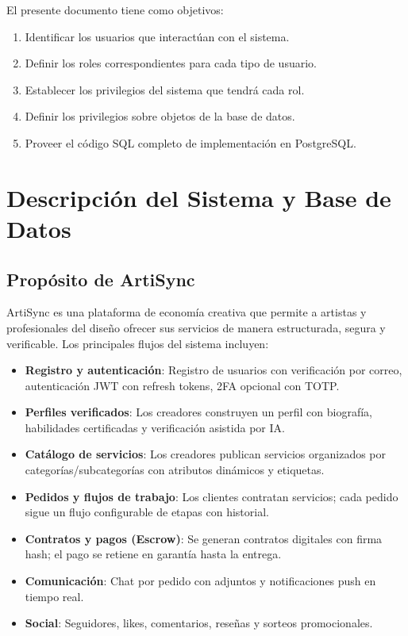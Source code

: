 \documentclass[conference, onecolumn]{IEEEtran}
\begin{document}
El presente documento tiene como objetivos:
\begin{enumerate}[label=\arabic*)]
    \item Identificar los usuarios que interactúan con el sistema.
    \item Definir los roles correspondientes para cada tipo de usuario.
    \item Establecer los privilegios del sistema que tendrá cada rol.
    \item Definir los privilegios sobre objetos de la base de datos.
    \item Proveer el código SQL completo de implementación en PostgreSQL.
\end{enumerate}

\section{Descripción del Sistema y Base de Datos}

\subsection{Propósito de ArtiSync}

ArtiSync es una plataforma de economía creativa que permite a artistas y profesionales del diseño ofrecer sus servicios de manera estructurada, segura y verificable. Los principales flujos del sistema incluyen:

\begin{itemize}
    \item \textbf{Registro y autenticación}: Registro de usuarios con verificación por correo, autenticación JWT con refresh tokens, 2FA opcional con TOTP.
    \item \textbf{Perfiles verificados}: Los creadores construyen un perfil con biografía, habilidades certificadas y verificación asistida por IA.
    \item \textbf{Catálogo de servicios}: Los creadores publican servicios organizados por categorías/subcategorías con atributos dinámicos y etiquetas.
    \item \textbf{Pedidos y flujos de trabajo}: Los clientes contratan servicios; cada pedido sigue un flujo configurable de etapas con historial.
    \item \textbf{Contratos y pagos (Escrow)}: Se generan contratos digitales con firma hash; el pago se retiene en garantía hasta la entrega.
    \item \textbf{Comunicación}: Chat por pedido con adjuntos y notificaciones push en tiempo real.
    \item \textbf{Social}: Seguidores, likes, comentarios, reseñas y sorteos promocionales.
\end{itemize}
\end{document}
